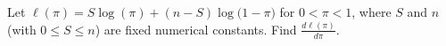 \documentclass[border=3bp]{standalone}
\begin{document}
\begin{minipage}{3.5in}
Let $\ell(\pi)=S\log(\pi)+(n-S)\log\!\bigl(1-\pi\bigr)$ for $0<\pi<1$, where $S$ and $n$ (with $0\le S\le n$) are fixed numerical constants. Find $\frac{d\ell(\pi)}{d\pi}$.
\end{minipage}
\end{document}
